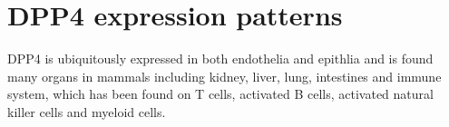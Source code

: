 \section{DPP4 expression patterns}
DPP4 is ubiquitously expressed in both endothelia and epithlia and is found  many organs in mammals including kidney, liver, lung, intestines and immune system, which has been found on T cells, activated B cells, activated natural killer cells and myeloid cells.~\cite{Abbott1994,Shingu2003,Hong1989,Gutschmidt1981,Dikov2004,Bühling1995,Tanaka1992,Gorrell1991}